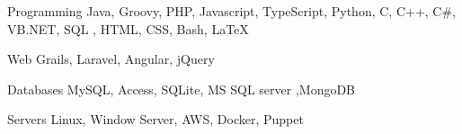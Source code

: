 
\begin{cvskills}

  \cvskill
    {Programming} %
    {Java, Groovy, PHP, Javascript, TypeScript, Python, C, C++, C\#, VB.NET, SQL , HTML, CSS, Bash, \LaTeX} %

  \cvskill
    {Web} %
    {Grails, Laravel, Angular, jQuery} %

  \cvskill
    {Databases} %
    {MySQL, Access, SQLite, MS SQL server ,MongoDB} %

  \cvskill
    {Servers} %
    {Linux, Window Server, AWS, Docker, Puppet} %


\end{cvskills}
